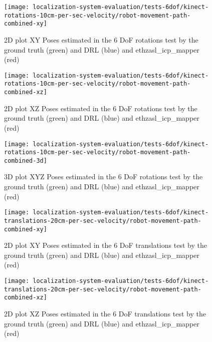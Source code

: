 \begin{figure}[H]
	\centering
	\texttt{[image: localization-system-evaluation/tests-6dof/kinect-rotations-10cm-per-sec-velocity/robot-movement-path-combined-xy]}
	\caption{2D plot XY Poses estimated in the 6 DoF rotations test by the ground truth (green) and DRL (blue) and ethzasl\_icp\_mapper (red)}
	\label{fig:localization-system-evaluation_kinect-rotations-robot-movement-path-combined-xy}
\end{figure}

\begin{figure}[H]
	\centering
	\hspace*{0.25cm}\texttt{[image: localization-system-evaluation/tests-6dof/kinect-rotations-10cm-per-sec-velocity/robot-movement-path-combined-xz]}
	\caption{2D plot XZ Poses estimated in the 6 DoF rotations test by the ground truth (green) and DRL (blue) and ethzasl\_icp\_mapper (red)}
	\label{fig:localization-system-evaluation_kinect-rotations-robot-movement-path-combined-xz}
\end{figure}

\begin{figure}[H]
	\centering
	\texttt{[image: localization-system-evaluation/tests-6dof/kinect-rotations-10cm-per-sec-velocity/robot-movement-path-combined-3d]}
	\caption{3D plot XYZ Poses estimated in the 6 DoF rotations test by the ground truth (green) and DRL (blue) and ethzasl\_icp\_mapper (red)}
	\label{fig:localization-system-evaluation_kinect-rotations-robot-movement-path-combined-3d}
\end{figure}


\begin{figure}[H]
	\centering
	\texttt{[image: localization-system-evaluation/tests-6dof/kinect-translations-20cm-per-sec-velocity/robot-movement-path-combined-xy]}
	\caption{2D plot XY Poses estimated in the 6 DoF translations test by the ground truth (green) and DRL (blue) and ethzasl\_icp\_mapper (red)}
	\label{fig:localization-system-evaluation_kinect-translations-robot-movement-path-combined-xy}
\end{figure}

\begin{figure}[H]
	\centering
	\hspace*{0.25cm}\texttt{[image: localization-system-evaluation/tests-6dof/kinect-translations-20cm-per-sec-velocity/robot-movement-path-combined-xz]}
	\caption{2D plot XZ Poses estimated in the 6 DoF translations test by the ground truth (green) and DRL (blue) and ethzasl\_icp\_mapper (red)}
	\label{fig:localization-system-evaluation_kinect-translations-robot-movement-path-combined-xz}
\end{figure}

